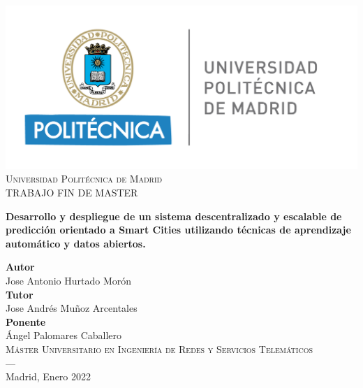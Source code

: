 \begin{titlepage}


\newlength{\centeroffset}
\setlength{\centeroffset}{-0.5\oddsidemargin}
\addtolength{\centeroffset}{0.5\evensidemargin}
\thispagestyle{empty}

\noindent\hspace*{\centeroffset}
\begin{minipage}{\textwidth}

\centering
\includegraphics[scale=0.6]{imagenes/upm.png}\\[1.4cm]

\textsc{ Universidad Politécnica de Madrid\\[0.2cm]}
\textsc{ \Large TRABAJO FIN DE MASTER\\[0.2cm]}

%
{\Large \bfseries  Desarrollo y despliegue de un sistema descentralizado y escalable de predicción orientado a Smart Cities utilizando técnicas de aprendizaje automático y datos abiertos.\\
}
\end{minipage}

\vspace{2cm}
\noindent\hspace*{\centeroffset}\begin{minipage}{\textwidth}
\centering

\textbf{Autor}\\ {Jose Antonio Hurtado Morón}\\[2.5ex]
\textbf{Tutor}\\ {Jose Andrés Muñoz Arcentales}\\[2ex]
\textbf{Ponente}\\{Ángel Palomares Caballero}\\[2cm]
\textsc{Máster Universitario en Ingeniería de Redes y Servicios Telemáticos}\\[1cm]
\textsc{---}\\
Madrid, Enero 2022
\end{minipage}
\end{titlepage}



